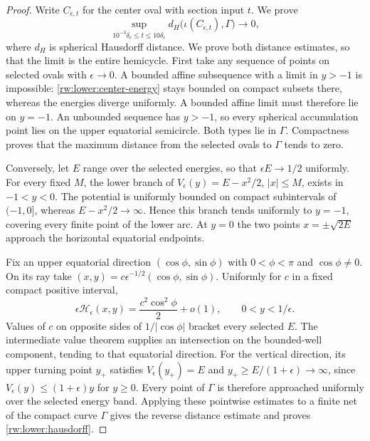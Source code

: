 \begin{proof}
Write $C_{\epsilon,t}$ for the center oval with section input $t$.
We prove
\begin{equation}\label{rw:lower:hausdorff}
 \sup_{10^{-3}\delta_\epsilon\le t\le10\delta_\epsilon}
 d_H\bigl(\iota(C_{\epsilon,t}),\Gamma\bigr)\longrightarrow0,
\end{equation}
where $d_H$ is spherical Hausdorff distance. We prove both distance
estimates, so that the limit is the entire hemicycle.
First take any sequence of points on selected ovals
with $\epsilon\to0$. A bounded affine subsequence with a limit in
$y>-1$ is impossible: \eqref{rw:lower:center-energy} stays bounded
on compact subsets there, whereas the energies diverge uniformly.
A bounded affine limit must therefore lie on $y=-1$.
An unbounded sequence has $y>-1$, so every spherical accumulation
point lies on the upper equatorial semicircle. Both types lie in
$\Gamma$. Compactness proves that the maximum distance from the
selected ovals to $\Gamma$ tends to zero.

Conversely, let $E$ range over the selected energies, so that
$\epsilon E\to1/2$ uniformly. For every fixed $M$, the lower branch
of $V_\epsilon(y)=E-x^2/2$, $|x|\le M$, exists in $-1<y<0$.
The potential is uniformly bounded on compact subintervals of
$(-1,0]$, whereas $E-x^2/2\to\infty$. Hence this branch tends
uniformly to $y=-1$, covering every finite point of the lower arc.
At $y=0$ the two points $x=\pm\sqrt{2E}$ approach the horizontal
equatorial endpoints.

Fix an upper equatorial direction $(\cos\phi,\sin\phi)$ with
$0<\phi<\pi$ and $\cos\phi\ne0$. On its ray take
$(x,y)=c\epsilon^{-1/2}(\cos\phi,\sin\phi)$. Uniformly for $c$
in a fixed compact positive interval,
\[
 \epsilon\mathscr H_\epsilon(x,y)
     =\frac{c^2\cos^2\phi}{2}+o(1),
 \qquad 0<y<1/\epsilon.
\]
Values of $c$ on opposite sides of $1/|\cos\phi|$ bracket every
selected $E$. The intermediate value theorem supplies an intersection
on the bounded-well component, tending to that equatorial direction.
For the vertical direction, its upper turning point $y_+$ satisfies
$V_\epsilon(y_+)=E$ and
$y_+\ge E/(1+\epsilon)\to\infty$, since
$V_\epsilon(y)\le(1+\epsilon)y$ for $y\ge0$.
Every point of $\Gamma$ is therefore approached uniformly over the
selected energy band. Applying these pointwise estimates to a finite
net of the compact curve $\Gamma$ gives the reverse distance estimate
and proves \eqref{rw:lower:hausdorff}.


\end{proof}
